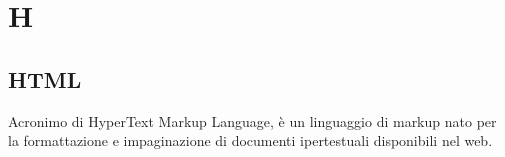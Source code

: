\section*{H}

\subsection{HTML}
Acronimo di HyperText Markup Language,  è un linguaggio di markup nato per la formattazione e impaginazione di documenti ipertestuali disponibili nel web.